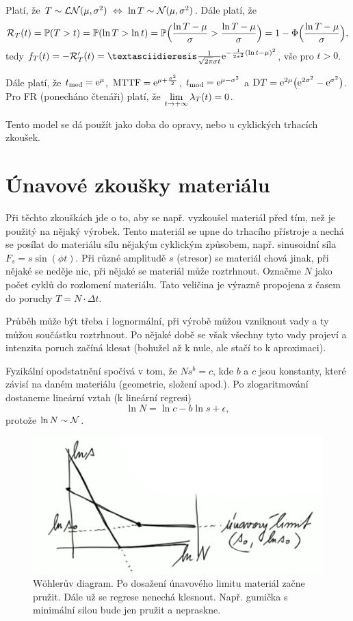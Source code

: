 \begin{define}
	Platí, že $T\sim \mathcal{LN}(\mu,\sigma^2)~\Leftrightarrow~\ln 
	T\sim\mathcal{N}(\mu,\sigma^2)$. Dále platí, že $$\mathcal{R}_T(t)=\mathbb{P}(T>t)=\mathbb{P}(\ln 
	T>\ln t)=\mathbb{P}\Big(\frac{\ln T-\mu}{\sigma}>\frac{\ln 
	T-\mu}{\sigma}\Big)=1-\Phi\Big(\frac{\ln T-\mu}{\sigma}\Big),$$ 
	tedy $f_T(t)=-\RT'(t)=¨\frac{1}{\sqrt{2\pi}\sigma 
	t}\e{-\frac{1}{2\sigma^2}(\ln t-\mu)^2}$, vše pro $t>0$.
\end{define}

Dále platí, že $t_\mathrm{med}=\mathrm{e}^{\mu}$, $\mathrm{MTTF}=\mathrm{e}^{\mu+\frac{\sigma^2}{2}}$, $t_\mathrm{mod}=\mathrm{e}^{\mu-\sigma^2}$ a $\mathrm{D} T=\mathrm{e}^{2\mu}\big(\mathrm{e}^{2\sigma^2}-\mathrm{e}^{\sigma^2}\big)$. Pro FR (ponecháno čtenáři) platí, že $\lim\limits_{t\to+\infty}\lambda_T(t)=0$.

Tento model se dá použít jako doba do opravy, nebo u cyklických trhacích zkoušek.

\section{Únavové zkoušky materiálu}
Při těchto zkouškách jde o to, aby se např. vyzkoušel materiál před 
tím, než je použitý na nějaký výrobek. Tento materiál se upne do 
trhacího přístroje a nechá se posílat do materiálu sílu nějakým 
cyklickým způsobem, např. sinusoidní síla $F_s=s\sin(\phi t)$. Při 
různé amplitudě $s$ (stresor) se materiál chová jinak, při nějaké se 
neděje nic, při nějaké se materiál může roztrhnout. Označme $N$ jako 
počet cyklů do rozlomení materiálu. Tato veličina je výrazně propojena 
z časem do poruchy $T=N\cdot\Delta t$. 

Průběh může být třeba i lognormální, při výrobě můžou vzniknout vady a 
ty můžou součástku roztrhnout. Po nějaké době se však všechny tyto 
vady projeví a intenzita poruch začíná klesat (bohužel až k nule, ale 
stačí to k aproximaci).

Fyzikální opodstatnění spočívá v tom, že $Ns^b=c$, kde $b$ a $c$ jsou konstanty, které závisí na daném materiálu (geometrie, složení apod.). Po zlogaritmování dostaneme lineární vztah (k lineární regresi)
$$ \ln N=\ln c-b\ln s + \epsilon, $$
protože $\ln N\sim \mathcal{N}$.

\begin{figure}[h]
	\centering
	\includegraphics[width=0.4\linewidth]{pictures/Wohler}
	\caption{Wöhlerův diagram. Po dosažení únavového limitu materiál 
	začne pružit. Dále už se regrese nenechá klesnout. Např. gumička s 
	minimální silou bude jen pružit a nepraskne.}
	\label{fig:wohler}
\end{figure}


